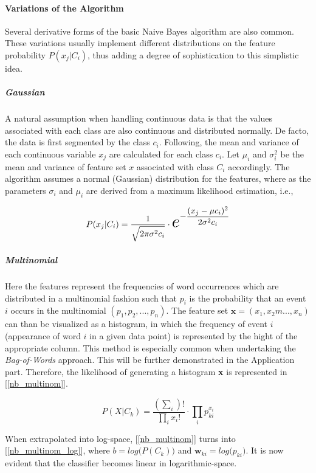 	\paragraph{Variations of the Algorithm}
		Several derivative forms of the basic Naive Bayes algorithm are also common. These variations usually implement different distributions on the feature probability $ P(x_j|C_i) $, thus adding a degree of sophistication to this simplistic idea.
		
		\subparagraph{Gaussian}
			A natural assumption when handling continuous data is that the values associated with each class are also continuous and distributed normally. De facto, the data is first segmented by the class $ c_i $. Following, the mean and variance of each continuous variable $ x_j $ are calculated for each class  $ c_i $. Let $ \mu_i $ and $ \sigma_i^2 $ be the mean and variance of feature set $ x $ associated with class $ C_i $ accordingly. The algorithm assumes a normal (Gaussian) distribution for the features, where as the parameters $ \sigma_i $ and $ \mu_i $ are derived from a maximum likelihood estimation, i.e.,
	
		\begin{equation}
			P(x_j|C_i) = \frac{1}{\sqrt{\vphantom{\frac{1}{1}} 2 \pi \sigma^2 c_i}} \cdot 
			\scaleobj{2}{e}^{ \displaystyle - \frac{(x_j-\mu c_i)^2}{2 \sigma^2 c_i} }
		\end{equation}
	
		\subparagraph{Multinomial}
			Here the features represent the frequencies of word occurrences which are distributed in a multinomial fashion such that $ p_i $ is the probability that an event $ i $ occurs in the multinomial $ (p_1,p_2, ...,p_n) $. The feature set $ \textbf{x} = (x_1,x_2m ...,x_n) $ can than be visualized as a histogram, in which the frequency of event $ i $ (appearance of word $ i $ in a given data point) is represented by the hight of the appropriate column. This method is especially common when undertaking the \textit{Bag-of-Words} approach. This will be further demonstrated in the Application part. Therefore, the likelihood of generating a histogram \textbf{x} is represented in [\ref{nb_multinom}].
	
	\begin{equation}
		P(X|C_k) = \frac{(\sum_i)!}{\prod_i x_i !} \cdot \prod_i p_{ki}^{x_i}
		\label{nb_multinom}
	\end{equation}
	
		When extrapolated into log-space, [\ref{nb_multinom}] turns into [\ref{nb_multinom_log}], where $ b = log \big( P(C_k)\big) $ and $ \textbf{w}_{ki} = log \big( p_{ki} \big) $. It is now evident that the classifier becomes linear in logarithmic-space.
	
